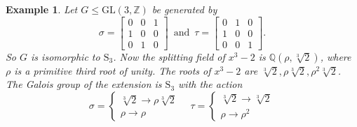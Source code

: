 \documentclass[12pt]{article}
\theoremstyle{plain}
\newtheorem{example}[theorem]{Example}
\newcommand{\Z}{\ensuremath{\mathbb{Z}}}
\newcommand{\Q}{\ensuremath{\mathbb{Q}}}
\begin{document}
\begin{example}
Let $G \leq \mathrm{GL}(3,\Z)$ be generated by $$\sigma = \begin{bmatrix}
0 & 0 &1\\
1 & 0 &0\\
0 & 1 & 0
\end{bmatrix}\,\,\, \text{and} \,\,\, \tau = \begin{bmatrix}
0 & 1 &0\\
1 & 0 &0\\
0 & 0 & 1
\end{bmatrix}.$$
So $G$ is isomorphic to $\mathrm{S}_3$. 
Now the splitting field of $x^3-2$ is $\Q(\rho, \sqrt[3]{2})$, where $\rho$ is a primitive third root of unity. The roots of $x^3-2$ are $\sqrt[3]{2},\rho \sqrt[3]{2}, \rho^2 \sqrt[3]{2}$. The Galois group of the extension is $\mathrm{S}_3$ with the action $$\sigma = \begin{cases} \sqrt[3]{2}\longrightarrow \rho \sqrt[3]{2} \\ \rho \longrightarrow \rho \end{cases}\,\,\, \,\,\,\tau = \begin{cases} \sqrt[3]{2}\longrightarrow \sqrt[3]{2} \\ \rho \longrightarrow \rho^2 \end{cases}$$
%
%
%

\end{example}
\end{document}
